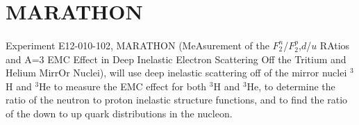



\section{MARATHON}
\paragraph{}Experiment E12-010-102, MARATHON (MeAsurement of the $F_2^n$/$F_2^p$,$d$/$u$ RAtios and A=3 EMC Effect in Deep Inelastic Electron Scattering Off the Tritium and Helium MirrOr Nuclei), will use deep inelastic scattering off of the mirror nuclei $^3$H and $^3$He to measure the EMC effect for both $^3$H and $^3$He, to determine the ratio of the neutron to proton inelastic structure functions, and to find the ratio of the down to up quark distributions in the nucleon.

